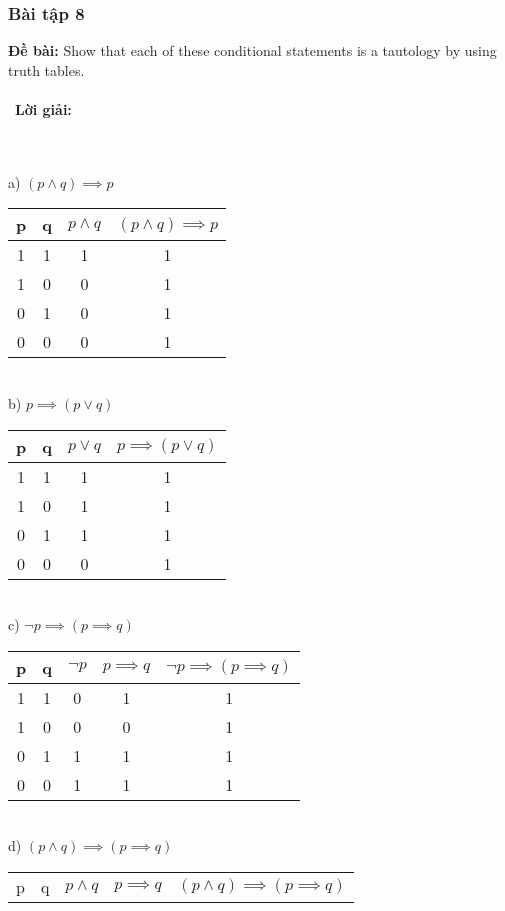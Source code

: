 \documentclass[a4paper]{article}
\begin{document}
\subsubsection{Bài tập 8}
\textbf{Đề bài:} Show that each of these conditional statements is a tautology by using truth tables.
\\\ \\\
\textbf{Lời giải:} \\\ \\\
	\begin{table} [h]
	\flushleft a) $(p \land q) \implies p$\\
	\centering
		\begin{tabular} {|c|c|c|c|}
			\hline
			p&q&$p \land q$&$(p \land q) \implies p$\\
			\hline
			1&1&1&1\\
			1&0&0&1\\
			0&1&0&1\\
			0&0&0&1\\
			\hline
		\end{tabular}
	\\
	\flushleft b) $p \implies (p \lor q)$\\
	\centering
		\begin{tabular}{|c|c|c|c|}
			\hline
			p&q&$p \lor q$&$p \implies (p \lor q)$\\
			\hline
			1&1&1&1\\
			1&0&1&1\\
			0&1&1&1\\
			0&0&0&1\\
			\hline
		\end{tabular}
	\\
	\flushleft	c)  $\lnot p \implies (p \implies q) $\\ 
	\centering
		\begin{tabular} {|c|c|c|c|c|}
			\hline
			p&q&$\lnot p$&$p \implies q$&$\lnot p \implies (p \implies q)$\\
			\hline
			1&1&0&1&1\\
			1&0&0&0&1\\
			0&1&1&1&1\\
			0&0&1&1&1\\	
			\hline
		\end{tabular}
	\\
	\flushleft	d)   $(p \land q) \implies (p \implies q)$\\
	\centering
		\begin{tabular} {|c|c|c|c|c|}
			\hline
			p&q&$p \land q$&$p \implies q$&$(p \land q) \implies (p \implies q)$\\

\end{tabular}
\end{table}
\end{document}
